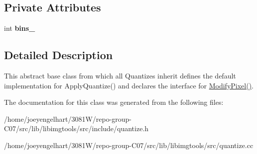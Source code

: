 \subsection*{Private Attributes}
\begin{DoxyCompactItemize}
\item 
int {\bfseries bins\+\_\+}\hypertarget{classimage__tools_1_1Quantize_a6349c5e8989e8aee2ed8b6f3643cff88}{}\label{classimage__tools_1_1Quantize_a6349c5e8989e8aee2ed8b6f3643cff88}

\end{DoxyCompactItemize}


\subsection{Detailed Description}
This abstract base class from which all Quantizes inherit defines the default implementation for Apply\+Quantize() and declares the interface for \hyperlink{classimage__tools_1_1Quantize_a6bcad798751b09dcc88f343d8bfc65f8}{Modify\+Pixel()}. 

The documentation for this class was generated from the following files\+:\begin{DoxyCompactItemize}
\item 
/home/joeyengelhart/3081\+W/repo-\/group-\/\+C07/src/lib/libimgtools/src/include/quantize.\+h\item 
/home/joeyengelhart/3081\+W/repo-\/group-\/\+C07/src/lib/libimgtools/src/quantize.\+cc\end{DoxyCompactItemize}
